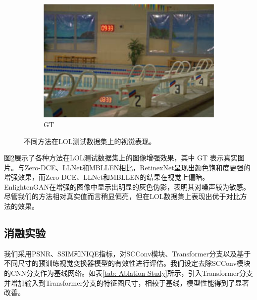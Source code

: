 \documentclass[a4paper]{ctexart}
\begin{document}
\begin{figure}[htb]
\begin{subfigure}{0.19\textwidth}
			\includegraphics[width=\linewidth]{picture/LLIE/Efficent/GT}
			\captionsetup{font=scriptsize}
			\caption{GT}
			\label{fig: GT}	
		\end{subfigure}
		\caption{
			\label{fig: LOL}
			不同方法在LOL测试数据集上的视觉表现。
		}
	\end{figure}
	
	图\ref{fig: LOL}展示了各种方法在LOL测试数据集上的图像增强效果，其中 GT 表示真实图片。与Zero-DCE、LLNet和MBLLEN相比，RetinexNet呈现出颜色饱和度更强的增强效果，而Zero-DCE、LLNet和MBLLEN的结果在视觉上偏暗。EnlightenGAN在增强的图像中显示出明显的灰色伪影，表明其对噪声较为敏感。尽管我们的方法相对真实值而言稍显偏亮，但在LOL数据集上表现出优于对比方法的效果。
	
	\subsection{消融实验}
	
	我们采用PSNR、SSIM和NIQE指标，对SCConv模块、Transformer分支以及基于不同尺寸的预训练视觉变换器模型的有效性进行评估。我们设定去除SCConv模块的CNN分支作为基线网络。如表\ref{tab: Ablation Study}所示，引入Transformer分支并增加输入到Transformer分支的特征图尺寸，相较于基线，模型性能得到了显著改善。
	
\end{document}
